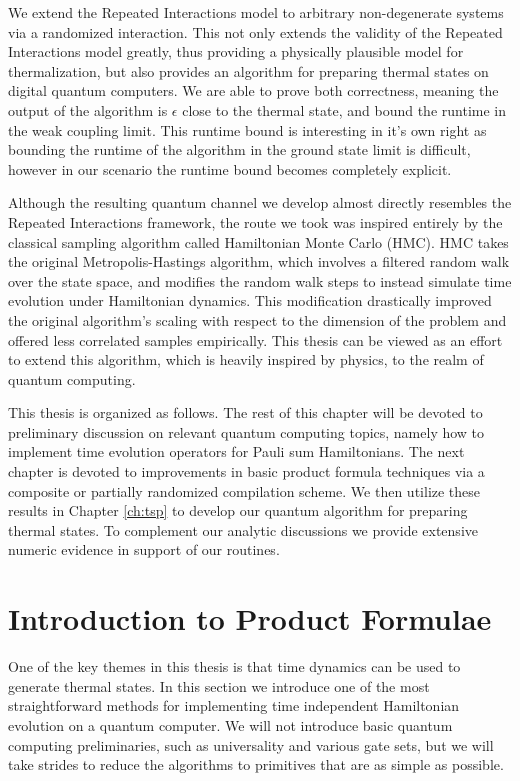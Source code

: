 We extend the Repeated Interactions model to arbitrary non-degenerate systems via a randomized interaction. This not only extends the validity of the Repeated Interactions model greatly, thus providing a physically plausible model for thermalization, but also provides an algorithm for preparing thermal states on digital quantum computers. We are able to prove both correctness, meaning the output of the algorithm is $\epsilon$ close to the thermal state, and bound the runtime in the weak coupling limit. This runtime bound is interesting in it's own right as bounding the runtime of the algorithm in the ground state limit is difficult, however in our scenario the runtime bound becomes completely explicit. 

Although the resulting quantum channel we develop almost directly resembles the Repeated Interactions framework, the route we took was inspired entirely by the classical sampling algorithm called Hamiltonian Monte Carlo (HMC). HMC takes the original Metropolis-Hastings algorithm, which involves a filtered random walk over the state space, and modifies the random walk steps to instead simulate time evolution under Hamiltonian dynamics. This modification drastically improved the original algorithm's scaling with respect to the dimension of the problem and offered less correlated samples empirically. This thesis can be viewed as an effort to extend this algorithm, which is heavily inspired by physics, to the realm of quantum computing. 

This thesis is organized as follows. The rest of this chapter will be devoted to preliminary discussion on relevant quantum computing topics, namely how to implement time evolution operators for Pauli sum Hamiltonians. The next chapter is devoted to improvements in basic product formula techniques via a composite or partially randomized compilation scheme. We then utilize these results in Chapter \ref{ch:tsp} to develop our quantum algorithm for preparing thermal states. To complement our analytic discussions we provide extensive numeric evidence in support of our routines. 

\section{Introduction to Product Formulae}
One of the key themes in this thesis is that time dynamics can be used to generate thermal states. In this section we introduce one of the most straightforward methods for implementing time independent Hamiltonian evolution on a quantum computer. We will not introduce basic quantum computing preliminaries, such as universality and various gate sets, but we will take strides to reduce the algorithms to primitives that are as simple as possible. 

